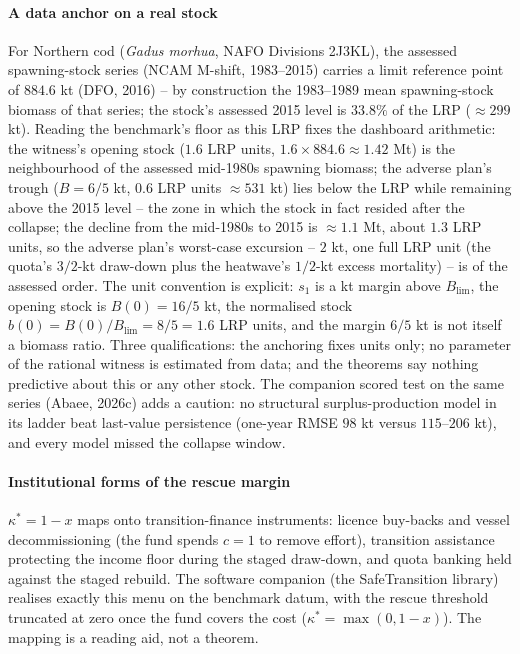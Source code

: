 \paragraph{A data anchor on a real stock} For Northern cod (\emph{Gadus morhua}, NAFO Divisions 2J3KL), the assessed spawning-stock series (NCAM M-shift, 1983--2015) carries a limit reference point of $884.6$ kt (DFO, 2016) -- by construction the 1983--1989 mean spawning-stock biomass of that series; the stock's assessed 2015 level is $33.8\%$ of the LRP ($\approx299$ kt). Reading the benchmark's floor as this LRP fixes the dashboard arithmetic: the witness's opening stock ($1.6$ LRP units, $1.6\times884.6\approx1.42$ Mt) is the neighbourhood of the assessed mid-1980s spawning biomass; the adverse plan's trough ($B=6/5$ kt, $0.6$ LRP units $\approx531$ kt) lies below the LRP while remaining above the 2015 level -- the zone in which the stock in fact resided after the collapse; the decline from the mid-1980s to 2015 is $\approx1.1$ Mt, about $1.3$ LRP units, so the adverse plan's worst-case excursion -- $2$ kt, one full LRP unit (the quota's $3/2$-kt draw-down plus the heatwave's $1/2$-kt excess mortality) -- is of the assessed order. The unit convention is explicit: $s_1$ is a kt margin above $B_{\mathrm{lim}}$, the opening stock is $B(0)=16/5$ kt, the normalised stock $b(0)=B(0)/B_{\mathrm{lim}}=8/5=1.6$ LRP units, and the margin $6/5$ kt is not itself a biomass ratio. Three qualifications: the anchoring fixes units only; no parameter of the rational witness is estimated from data; and the theorems say nothing predictive about this or any other stock. The companion scored test on the same series (Abaee, 2026c) adds a caution: no structural surplus-production model in its ladder beat last-value persistence (one-year RMSE $98$ kt versus $115$--$206$ kt), and every model missed the collapse window.

\paragraph{Institutional forms of the rescue margin} $\kappa^*=1-x$ maps onto transition-finance instruments: licence buy-backs and vessel decommissioning (the fund spends $c=1$ to remove effort), transition assistance protecting the income floor during the staged draw-down, and quota banking held against the staged rebuild. The software companion (the SafeTransition library) realises exactly this menu on the benchmark datum, with the rescue threshold truncated at zero once the fund covers the cost ($\kappa^*=\max(0,1-x)$). The mapping is a reading aid, not a theorem.

